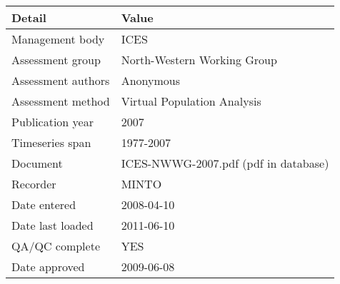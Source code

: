 \begin{table}[htb]
\centering
\begin{tabular}{ll}
\toprule
Detail & Value \\
\midrule
Management body    & ICES                                 \\
Assessment group   & North-Western Working Group          \\
Assessment authors & Anonymous                            \\
Assessment method  & Virtual Population Analysis          \\
Publication year   & 2007                                 \\
Timeseries span    & 1977-2007                            \\
Document           & ICES-NWWG-2007.pdf (pdf in database) \\
Recorder           & MINTO                                \\
Date entered       & 2008-04-10                           \\
Date last loaded   & 2011-06-10                           \\
QA/QC complete     & YES                                  \\
Date approved      & 2009-06-08                           \\
\bottomrule
\end{tabular}
\label{tab:assessdet}
\end{table}
